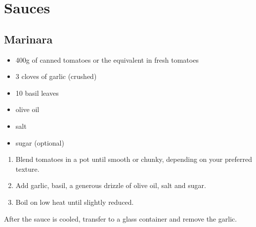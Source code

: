 \chapter{Sauces}
\section{Marinara}

\begin{itemize}
  \item 400g of canned tomatoes or the equivalent in fresh tomatoes
  \item 3 cloves of garlic (crushed)
  \item 10 basil leaves
  \item olive oil
  \item salt
  \item sugar (optional)
\end{itemize}

\begin{enumerate}
  \item Blend tomatoes in a pot until smooth or chunky, depending on your
    preferred texture.
  \item Add garlic, basil, a generous drizzle of olive oil, salt and sugar.
  \item Boil on low heat until slightly reduced.
\end{enumerate}

After the sauce is cooled, transfer to a glass container and remove the garlic.
